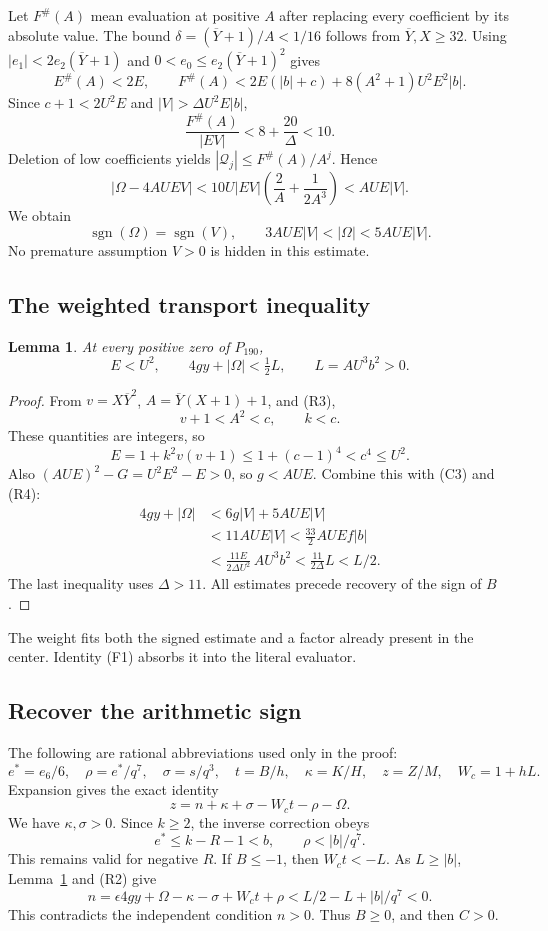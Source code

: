 \documentclass[11pt]{article}
\newtheorem{lemma}[theorem]{Lemma}
\theoremstyle{remark}
\newcommand{\yb}{\overline Y}
\begin{document}
Let \(F^\#(A)\) mean evaluation at positive \(A\) after replacing every
coefficient by its absolute value. The bound
\(\delta=(\yb+1)/A<1/16\) follows from \(\yb,X\ge32\).
Using \(|e_1|<2e_2(\yb+1)\) and \(0<e_0\le e_2(\yb+1)^2\) gives
\[
 E^\#(A)<2E,\qquad
 F^\#(A)<2E(|b|+c)+8(A^2+1)U^2E^2|b|.
\]
Since \(c+1<2U^2E\) and \(|V|>\Delta U^2E|b|\),
\[
 \frac{F^\#(A)}{|EV|}<8+\frac{20}{\Delta}<10.      \tag{C2}
\]
Deletion of low coefficients yields
\(|\mathcal Q_j|\le F^\#(A)/A^j\). Hence
\[
 |\Omega-4AUEV|
 <10U|EV|\left(\frac2A+\frac1{2A^3}\right)<AUE|V|.
\]
We obtain
\[
 \operatorname{sgn}(\Omega)=\operatorname{sgn}(V),\qquad
 3AUE|V|<|\Omega|<5AUE|V|.                        \tag{C3}
\]
No premature assumption \(V>0\) is hidden in this estimate.

\subsection{The weighted transport inequality}
\begin{lemma}\label{lem:transport}
At every positive zero of \(P_{190}\),
\[
 E<U^2,\qquad 4gy+|\Omega|<\tfrac12L,\qquad L=AU^3b^2>0.
\]
\end{lemma}
\begin{proof}
From \(v=X\yb^2\), \(A=\yb(X+1)+1\), and (R3),
\[
 v+1<A^2<c,\qquad k<c.
\]
These quantities are integers, so
\[
 E=1+k^2v(v+1)\le1+(c-1)^4<c^4\le U^2.
\]
Also \((AUE)^2-G=U^2E^2-E>0\), so \(g<AUE\).
Combine this with (C3) and (R4):
\begin{align*}
 4gy+|\Omega|
  &<6g|V|+5AUE|V|\\
  &<11AUE|V|<\frac{33}{2}AUEf|b|\\
  &<\frac{11E}{2\Delta U^2}\,AU^3b^2
   <\frac{11}{2\Delta}L<L/2.
\end{align*}
The last inequality uses \(\Delta>11\).
All estimates precede recovery of the sign of \(B\).
\end{proof}

The weight fits both the signed estimate and a factor already present in
the center. Identity (F1) absorbs it into the literal evaluator.

\subsection{Recover the arithmetic sign}
The following are rational abbreviations used only in the proof:
\[
 e^*=e_6/6,\quad \rho=e^*/q^7,\quad
 \sigma=s/q^3,\quad t=B/h,\quad\kappa=K/H,\quad
 z=Z/M,\quad W_c=1+hL.
\]
Expansion gives the exact identity
\[
 z=n+\kappa+\sigma-W_ct-\rho-\Omega.              \tag{T}
\]
We have \(\kappa,\sigma>0\). Since \(k\ge2\), the inverse correction obeys
\[
 e^*\le k-R-1<b,\qquad \rho<|b|/q^7.             \tag{T1}
\]
This remains valid for negative \(R\).
If \(B\le-1\), then \(W_ct<-L\). As \(L\ge|b|\),
Lemma~\ref{lem:transport} and (R2) give
\[
 n=\epsilon4gy+\Omega-\kappa-\sigma+W_ct+\rho
       <L/2-L+|b|/q^7<0.
\]
This contradicts the independent condition \(n>0\).
Thus \(B\ge0\), and then \(C>0\).
\end{document}

